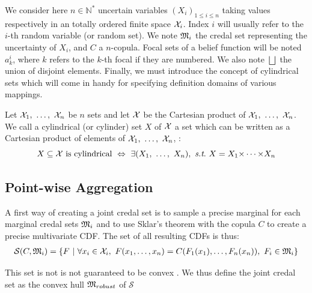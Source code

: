We consider here $n\in\mathbb{N}^*$ uncertain variables $(X_i)_{1\leqslant i\leqslant n}$ taking values respectively in an totally ordered finite space ${\mathcal{X}}_i$. Index $i$ will usually refer to the $i$-th random variable (or random set). We note ${\mathfrak{M}}_i$ the credal set representing the uncertainty of $X_i$, and $C$ a $n$-copula. Focal sets of a belief function will be noted $a^i_k$, where $k$ refers to the $k$-th focal if they are numbered. We also note $\bigsqcup$ the union of disjoint elements. Finally, we must introduce the concept of cylindrical sets which will come in handy for specifying definition domains of various mappings. 
\begin{definition}
    Let ${\mathcal{X}}_1,~\dots,~{\mathcal{X}}_n$ be $n$ sets and let ${\mathcal{X}}$ be the Cartesian product of ${\mathcal{X}}_1,~\dots,~{\mathcal{X}}_n$. We call a cylindrical (or cylinder) set $X$ of ${\mathcal{X}}$ a set which can be written as a Cartesian product of elements of ${\mathcal{X}}_1,~\dots,~{\mathcal{X}}_n$, \ie:
    \begin{equation}
        X\subseteq\X \text{ is cylindrical} ~\Leftrightarrow~ \exists (X_1,~\dots,~X_n),~\st~X=X_1\tdt X_n \label{eq:cylindrical_sets}
    \end{equation}
\end{definition}

\subsection{Point-wise Aggregation}\label{sec:robust_method}
A first way of creating a joint credal set is to sample a precise marginal for each marginal credal sets ${\mathfrak{M}}_i$ and to use Sklar's theorem with the copula $C$ to create a precise multivariate CDF. The set of all resulting CDFs is thus:
\begin{eqnarray}\label{eq:robust_ancestor}
    \mathcal{S}(C,{\mathfrak{M}}_i) = \{F~|~\forall x_i \in {\mathcal{X}}_i,~ F(x_1,\dots,x_n) = C(F_1(x_1), \dots, F_n(x_n)),~F_i\in{\mathfrak{M}}_i \}
\end{eqnarray}

This set is not is not guaranteed to be convex \cite{schmelzer_random_2023}. We thus define the joint credal set as the convex hull ${\mathfrak{M}}_{robust}$ of $\mathcal{S}$


